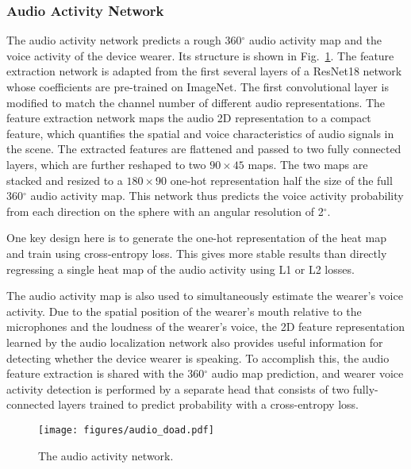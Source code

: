 \documentclass[10pt,twocolumn,letterpaper]{article}
\begin{document}
\vspace{-10pt}
\subsubsection{Audio Activity Network}
\vspace{-5pt}

The audio activity network predicts a rough 360$^{\circ}$ audio activity map and the voice activity of the device wearer. 
Its structure is shown in Fig.~\ref{fig:audio-doa}.
The feature extraction network is adapted from the first several layers of a ResNet18 network whose coefficients
are pre-trained on ImageNet. The first convolutional layer is modified to match the channel number of 
different audio representations.
The feature extraction network maps the audio 2D representation to a compact feature, which quantifies 
the spatial and voice characteristics of audio signals in the scene.
The extracted features are flattened and passed to two fully connected layers, which are further
reshaped to two $90\times45$ maps. The two maps are stacked and resized to a $180\times90$ one-hot representation
half the size of the full 360$^{\circ}$ audio activity map. This network thus predicts the voice activity probability 
from each direction on the sphere with an angular resolution of 2$^{\circ}$. 

One key design here is to generate the one-hot representation of the heat map and train using cross-entropy loss. 
This gives more stable results than  
directly regressing a single heat map of the audio activity using L1 or L2 losses.

The audio activity map is also used to simultaneously estimate the wearer's voice activity.
Due to the spatial position of the wearer's mouth relative to the microphones and the loudness
of the wearer's voice, the 2D feature representation learned by the audio localization network also 
provides useful information for detecting whether the device wearer is speaking.
To accomplish this, the audio feature extraction is shared with the 360$^{\circ}$ audio map prediction,
and wearer voice activity detection is performed by a separate head that consists of two fully-connected layers
trained to predict probability with a cross-entropy loss.

\begin{figure}[tb]
\centering
\texttt{[image: figures/audio\_doad.pdf]}
\vspace{-5pt}
\caption{The audio activity network.}
\vspace{-10pt}
\label{fig:audio-doa}	
\end{figure}
\end{document}
